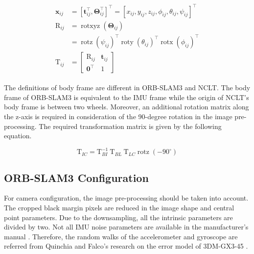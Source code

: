 \documentclass[letterpaper, 10 pt, conference]{ieeeconf}  %
\begin{document}
\begin{align}
\begin{split}
    \mathbf{x}_{i j}&=\left[ \mathbf{t}_{i j}^{\top}, \mathbf{\Theta}_{i j}^{\top}\right]^{\top}=\left[x_{i j}, y_{i j}, z_{i j}, \phi_{i j}, \theta_{i j}, \psi_{i j}\right]^{\top}\\
    \mathrm{R}_{ij} &=\operatorname{rotxyz}\left(\boldsymbol{\Theta}_{i j}\right) \\
    &=\operatorname{rotz}\left(\psi_{i j}\right)^{\top} \operatorname{roty}\left(\theta_{i j}\right)^{\top} \operatorname{rotx}\left(\phi_{i j}\right)^{\top} \\ \mathrm{T}_{ij}&=\left[\begin{array}{cc}
 \mathrm{R}_{ij} & \mathbf{t}_{i j} \\
\mathbf{0}^{\top} & 1
\end{array}\right]
\end{split}
\end{align}

The definitions of body frame are different in ORB-SLAM3 and NCLT. The body frame of ORB-SLAM3 is equivalent to the IMU frame while the origin of NCLT’s body frame is between two wheels. Moreover, an additional rotation matrix along the z-axis is required in consideration of the 90-degree rotation in the image pre-processing. The required transformation matrix is given by the following equation.

\begin{equation}
\mathrm{T}_{I C}=\mathrm{T}_{B I}^{-1} \mathrm{~T}_{B L} \mathrm{~T}_{L C} \operatorname{rotz}\left(-90^{\circ}\right)
\end{equation}

\subsection{ORB-SLAM3 Configuration}

For camera configuration, the image pre-processing should
be taken into account. The cropped black margin pixels are
reduced in the image shape and central point parameters.
Due to the downsampling, all the intrinsic parameters are
divided by two. Not all IMU noise parameters
are available in the manufacturer’s manual \cite{3DM-GX3-45}. Therefore, the random walks of the accelerometer and gyroscope are referred from Quinchia and Falco's research on the error model of 3DM-GX3-45 \cite{IMU_error}.
\end{document}
